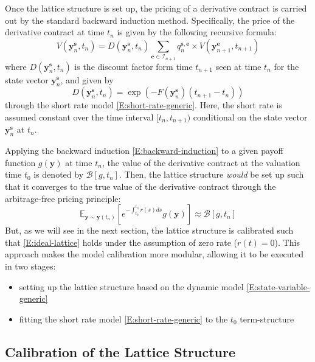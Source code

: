 \documentclass{texyise}
\newcommand{\indexset}{\mathcal{I}}
\newcommand{\valuebackward}{\mathcal{B}}
\begin{document}
Once the lattice structure is set up, the pricing of a derivative contract is carried out by the standard backward induction method. Specifically, the price of the derivative contract at time $t_n$ is given by the following recursive formula:
\begin{equation}
    V(\bm{y}_{n}^{\bm{s}}, t_n) = D(\bm{y}_n^{\bm{s}}, t_n)\sum_{\bm{e} \in \indexset_{n+1}} q_{n}^{\bm{s},\bm{e}} \times V(\bm{y}_{n+1}^{\bm{e}}, t_{n+1}) \label{E:backward-induction}
\end{equation}
where $D(\bm{y}_n^{\bm{s}}, t_n)$ is the discount factor form time $t_{n+1}$ seen at time $t_{n}$ for the state vector $\bm{y}_n^{\bm{s}}$, and given by
\begin{equation}
    D(\bm{y}_n^{\bm{s}}, t_n) = \exp\left(-F(\bm{y}_n^{\bm{s}}) (t_{n+1} -t_n) \right)
\end{equation}
through the short rate model \eqref{E:short-rate-generic}. Here, the short rate is assumed constant over the time interval $[t_n, t_{n+1})$ conditional on the state vector $\bm{y}_n^{\bm{s}}$ at $t_{n}$.

Applying the backward induction \eqref{E:backward-induction} to a given payoff function $g(\bm{y})$ at time $t_n$, the value of the derivative contract at the valuation time $t_0$ is denoted by $\valuebackward[g, t_n]$. Then, the lattice structure {\em would} be set up such that it converges to the true value of the derivative contract through the arbitrage-free pricing principle:
\begin{equation}
    \mathbb{E}_{\bm{y} \sim \bm{y}(t_n)}\left[ e^{-\int_{t_0}^{t_n} r(s)ds} g(\bm{y}) \right] \approx \valuebackward[g,t_n] \label{E:ideal-lattice}
\end{equation}
But, as we will see in the next section, the lattice structure is calibrated such that \eqref{E:ideal-lattice} holds under the assumption of zero rate ($r(t) = 0$). This approach makes the model calibration more modular, allowing it to be executed in two stages:
\begin{itemize}
    \item setting up the lattice structure based on the dynamic model \eqref{E:state-variable-generic}
    \item fitting the short rate model \eqref{E:short-rate-generic} to the $t_0$ term-structure
\end{itemize}

\subsection{Calibration of the Lattice Structure}
\end{document}
